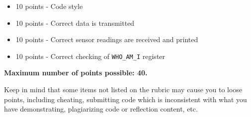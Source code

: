 \documentclass{article}
\begin{document}
\begin{itemize}

	\item 10 points - Code style

	\item 10 points - Correct data is transmitted

	\item 10 points - Correct sensor readings are received and printed

	\item 10 points - Correct checking of \texttt{WHO\_AM\_I} register

\end{itemize}

\textbf{Maximum number of points possible: 40.}

Keep in mind that some items not listed on the rubric may cause you to loose
points, including cheating, submitting code which is inconsistent with what you
have demonstrating, plagiarizing code or reflection content, etc.
\end{document}

